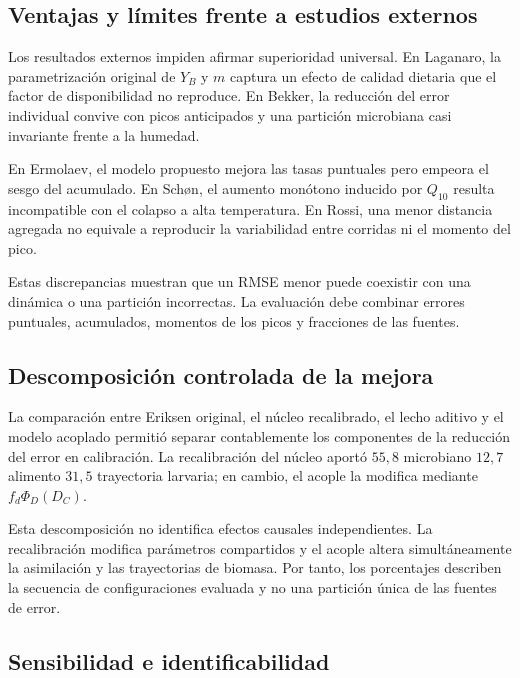 \subsection{Ventajas y límites frente a estudios externos}

Los resultados externos impiden afirmar superioridad universal. En
Laganaro, la parametrización original de $Y_B$ y $m$ captura un efecto
de calidad dietaria que el factor de disponibilidad no reproduce. En
Bekker, la reducción del error individual convive con picos anticipados
y una partición microbiana casi invariante frente a la humedad.

En Ermolaev, el modelo propuesto mejora las tasas puntuales pero empeora
el sesgo del acumulado. En Schøn, el aumento monótono inducido por
$Q_{10}$ resulta incompatible con el colapso a alta temperatura. En
Rossi, una menor distancia agregada no equivale a reproducir la
variabilidad entre corridas ni el momento del pico.

Estas discrepancias muestran que un RMSE menor puede coexistir con una
dinámica o una partición incorrectas. La evaluación debe combinar
errores puntuales, acumulados, momentos de los picos y fracciones de
las fuentes.

\subsection{Descomposición controlada de la mejora}

La comparación entre Eriksen original, el núcleo recalibrado, el lecho
aditivo y el modelo acoplado permitió separar contablemente los
componentes de la reducción del error en calibración. La recalibración
del núcleo aportó $55{,}8$ %
\co{} microbiano $12{,}7$ %
alimento $31{,}5$ %
trayectoria larvaria; en cambio, el acople la modifica mediante
$f_d\Phi_D(D_C)$.

Esta descomposición no identifica efectos causales independientes. La
recalibración modifica parámetros compartidos y el acople altera
simultáneamente la asimilación y las trayectorias de biomasa. Por tanto,
los porcentajes describen la secuencia de configuraciones evaluada y no
una partición única de las fuentes de error.

\subsection{Sensibilidad e identificabilidad}


